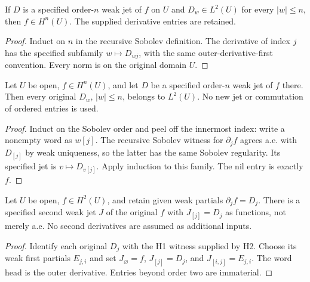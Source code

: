 \begin{lemma}
\label{lem:finite-weak-jet-sobolev}
\leanok
If $D$ is a specified order-$n$ weak jet of $f$ on $U$ and
$D_w\in L^2(U)$ for every $|w|\le n$, then $f\in H^n(U)$.
The supplied derivative entries are retained.
\end{lemma}

\begin{proof}
\leanok
Induct on $n$ in the recursive Sobolev definition.
The derivative of index $j$ has the specified subfamily $w\mapsto D_{wj}$,
with the same outer-derivative-first convention.
Every norm is on the original domain $U$.
\end{proof}

\begin{lemma}
\label{lem:specified-jet-lp}
\leanok
Let $U$ be open, $f\in H^n(U)$, and let $D$ be a specified order-$n$
weak jet of $f$ there. Then every original $D_w$, $|w|\le n$,
belongs to $L^2(U)$. No new jet or commutation of ordered entries is used.
\end{lemma}

\begin{proof}
\leanok
Induct on the Sobolev order and peel off the innermost index:
write a nonempty word as $w[j]$.
The recursive Sobolev witness for $\partial_jf$ agrees a.e. with
$D_{[j]}$ by weak uniqueness, so the latter has the same Sobolev regularity.
Its specified jet is $v\mapsto D_{v[j]}$. Apply induction to this family.
The nil entry is exactly $f$.
\end{proof}

\begin{lemma}
\label{lem:specified-first-jet-extension}
\leanok
Let $U$ be open, $f\in H^2(U)$, and retain given weak partials
$\partial_jf=D_j$.
There is a specified second weak jet $J$ of the original $f$ with
$J_{[j]}=D_j$ as functions, not merely a.e.
No second derivatives are assumed as additional inputs.
\end{lemma}

\begin{proof}
\leanok
Identify each original $D_j$ with the H1 witness supplied by H2.
Choose its weak first partials $E_{j,i}$ and set
$J_\varnothing=f$, $J_{[j]}=D_j$, and $J_{[i,j]}=E_{j,i}$.
The word head is the outer derivative. Entries beyond order two are immaterial.
\end{proof}

